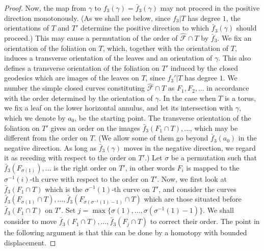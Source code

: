 \documentclass{amsart}
\theoremstyle{definition}
\numberwithin{figure}{section}
\numberwithin{equation}{section}
\begin{document}
\begin{proof}
Now, the map from $\gamma$ to $f_3(\gamma)=\bar f_3(\gamma)$ may not proceed in the positive direction monotonously.
(As we shall see below, since $f_3|T$ has degree $1$, the orientations of $T$ and $T'$ determine the positive direction to which $\bar f_3(\gamma)$ should proceed.)
This may cause a permutation of the order of $\hat{\mathcal F} \cap T$ by $\bar f_3$.
We fix an orientation of the foliation on $T$, which, together with the orientation of $T$, induces a transverse orientation of the leaves and an orientation of $\gamma$.
This also defines a transverse orientation of the foliation on $T'$ induced by the closed geodesics which are images of the leaves on $T$, since $f_3'|T$ has degree $1$.
We number the simple closed curves constituting $\hat{\mathcal F} \cap T$  as $F_1, F_2, \dots $ in accordance with the order determined by the orientation of $\gamma$.
In the case when $T$ is a torus, we fix a leaf on the lower horizontal annulus, and let its intersection  with $\gamma$, which we denote by $a_0$, be the starting point.
The transverse orientation of the foliation on $T'$ gives an order on the images $\bar f_3(F_1 \cap T), \dots $, which may be different from the order on $T$.
(We allow some of them go beyond $\bar f_3(a_0)$ in the negative direction.
As long as $\bar f_3(\gamma)$ moves in the negative direction, we regard it as receding with respect to the order on $T'$.)
Let $\sigma$ be a permutation such that $\bar f_3(F_{\sigma(1)}), \dots$ is the right order on $T'$, in other words $F_i$ is mapped to the $\sigma^{-1}(i)$-th curve with respect to the order on $T'$.
Now, we first look at $\bar f_3(F_1 \cap T)$ which is the $\sigma^{-1}(1)$-th curve on $T'$, and consider the curves $\bar f_3(F_{\sigma(1)} \cap T), \dots , \bar f_3(F_{\sigma(\sigma^{-1}(1)-1)} \cap T)$ which are those situated before $\bar f_3(F_1 \cap T)$ on $T'$.
Set $j=\max\{\sigma(1), \dots , \sigma(\sigma^{-1}(1)-1)\}$.
We shall consider to move $\bar f_3(F_1 \cap T) , \dots , \bar f_3(F_j \cap T)$ to correct their order.
The point in the following argument is that this can be done by a homotopy with  bounded displacement.




\end{proof}
\end{document}
